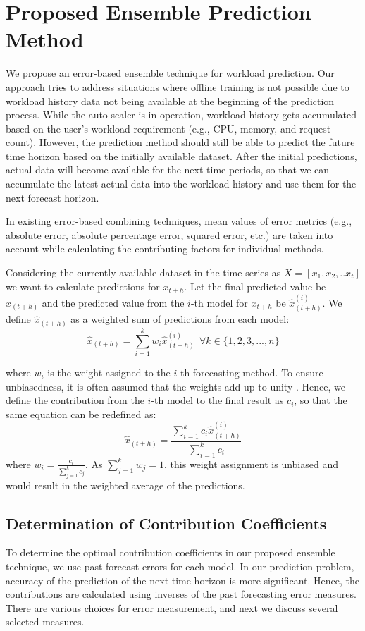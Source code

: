 \section{Proposed Ensemble Prediction Method}

We propose an error-based ensemble technique for workload prediction. Our approach tries to address situations where offline training is not possible due to workload history data not being available at the beginning of the prediction process. While the auto scaler is in operation, workload history gets accumulated based on the user's workload requirement (e.g., CPU, memory, and request count). However, the prediction method should still be able to predict the future time horizon based on the initially available dataset. After the initial predictions, actual data will become available for the next time periods, so that we can accumulate the latest actual data into the workload history and use them for the next forecast horizon.

In existing error-based combining techniques, mean values of error metrics (e.g., absolute error, absolute percentage error, squared error, etc.) are taken into account while calculating the contributing factors for individual methods. 

Considering the currently available dataset in the time series as
$X=[x_{1},x_{2},.. x_{t}]$
we want to calculate predictions for $x_{t+h}$. Let the final predicted value be $\hat{x}_{(t+h)}$ and the predicted value from the $i$-th model for $x_{t+h}$ be $\hat{x}_{(t+h)}^{(i)}$. We define $\hat{x}_{(t+h)}$ as a weighted sum of predictions from each model:
$$\hat{x}_{(t+h)}= \sum_{i=1}^{k}w_i \hat{x}_{(t+h)}^{(i)} \ \ \forall k \in \{1,2,3,...,n\}$$

where $w_i$ is the weight assigned to the $i$-th forecasting method. To ensure unbiasedness, it is often assumed that the weights add up to unity \cite{Adhikari_2012}. Hence, we define the contribution from the $i$-th model to the final result as $c_i$, so that the same equation can be redefined as:
$$\hat{x}_{(t+h)}= \frac{\sum_{i=1}^{k}c_i \hat{x}_{(t+h)}^{(i)}}{\sum_{i=1}^{k}c_i}$$ 
where $w_{i}= \frac{c_{i}}{\sum_{j=1}^{k}c_j}$. As $\sum_{j=1}^{k}w_{j}=1$, this weight assignment is unbiased and would result in the weighted average of the predictions.

\subsection{Determination of Contribution Coefficients}
To determine the optimal contribution coefficients in our proposed ensemble technique, we use past forecast errors for each model. In our prediction problem, accuracy of the prediction of the next time horizon is more significant. Hence, the contributions are calculated using inverses of the past forecasting error measures. There are various choices for error measurement, and next we discuss several selected measures.


